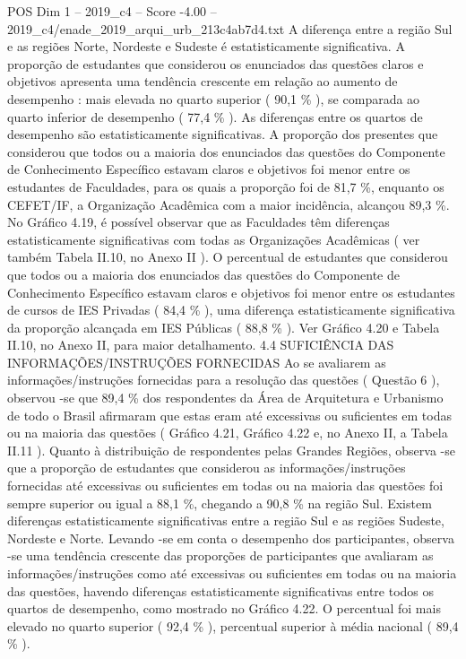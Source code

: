 \begin{textsample}{POS Dim 1 – 2019\_c4 – Score -4.00 – 2019\_c4/enade\_2019\_arqui\_urb\_213c4ab7d4.txt}
A diferença entre a região Sul e as regiões Norte, Nordeste e Sudeste é estatisticamente significativa.
A proporção de estudantes que considerou os enunciados das questões claros e objetivos apresenta uma tendência crescente em relação ao aumento de desempenho : mais elevada no quarto superior ( 90,1 \% ), se comparada ao quarto inferior de desempenho ( 77,4 \% ).
As diferenças entre os quartos de desempenho são estatisticamente significativas.
A proporção dos presentes que considerou que todos ou a maioria dos enunciados das questões do Componente de Conhecimento Específico estavam claros e objetivos foi menor entre os estudantes de Faculdades, para os quais a proporção foi de 81,7 \%, enquanto os CEFET/IF, a Organização Acadêmica com a maior incidência, alcançou 89,3 \%.
No Gráfico 4.19, é possível observar que as Faculdades têm diferenças estatisticamente significativas com todas as Organizações Acadêmicas ( ver também Tabela II.10, no Anexo II ).
O percentual de estudantes que considerou que todos ou a maioria dos enunciados das questões do Componente de Conhecimento Específico estavam claros e objetivos foi menor entre os estudantes de cursos de IES Privadas ( 84,4 \% ), uma diferença estatisticamente significativa da proporção alcançada em IES Públicas ( 88,8 \% ).
Ver Gráfico 4.20 e Tabela II.10, no Anexo II, para maior detalhamento. 4.4 SUFICIÊNCIA DAS INFORMAÇÕES/INSTRUÇÕES FORNECIDAS Ao se avaliarem as informações/instruções fornecidas para a resolução das questões ( Questão 6 ), observou -se que 89,4 \% dos respondentes da Área de Arquitetura e Urbanismo de todo o Brasil afirmaram que estas eram até excessivas ou suficientes em todas ou na maioria das questões ( Gráfico 4.21, Gráfico 4.22 e, no Anexo II, a Tabela II.11 ).
Quanto à distribuição de respondentes pelas Grandes Regiões, observa -se que a proporção de estudantes que considerou as informações/instruções fornecidas até excessivas ou suficientes em todas ou na maioria das questões foi sempre superior ou igual a 88,1 \%, chegando a 90,8 \% na região Sul.
Existem diferenças estatisticamente significativas entre a região Sul e as regiões Sudeste, Nordeste e Norte.
Levando -se em conta o desempenho dos participantes, observa -se uma tendência crescente das proporções de participantes que avaliaram as informações/instruções como até excessivas ou suficientes em todas ou na maioria das questões, havendo diferenças estatisticamente significativas entre todos os quartos de desempenho, como mostrado no Gráfico 4.22.
O percentual foi mais elevado no quarto superior ( 92,4 \% ), percentual superior à média nacional ( 89,4 \% ).

\end{textsample}
